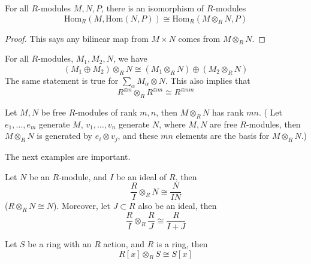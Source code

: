 \documentclass[openany]{book}
\begin{document}
\begin{thm}
    For all $R$-modules $M,N,P$, there is an isomorphism of $R$-modules
    \begin{equation*}
        \text{Hom}_R(M,\text{Hom}(N,P))\cong\text{Hom}_R(M\otimes_RN,P)
    \end{equation*}
\end{thm}
\begin{proof}
    This says any bilinear map from $M\times N$ comes from $M\otimes_RN$.
\end{proof}


\begin{prop}
    For all $R$-modules, $M_1,M_2, N$, we have 
    \begin{equation*}
        (M_1\oplus M_2)\otimes_RN\cong (M_1\otimes_RN)\oplus(M_2\otimes_RN)
    \end{equation*}
    The same statement is true for $\sum_\alpha M_\alpha\otimes N$. This also implies that 
    \begin{equation*}
        R^{\oplus n}\otimes_R R^{\oplus m}\cong R^{\oplus nm}
    \end{equation*}
\end{prop}


\begin{prop}
    Let $M,N$ be free $R$-modules of rank $m,n$, then $M\otimes_R N$ has rank $mn$.
   ( Let $e_1,\dots, e_m$ generate $M$, $v_1,\dots, v_n$ generate $N$, where $M,N$ are free $R$-modules, then $M\otimes_RN$ is generated by $e_i\otimes v_j$, and these $mn$ elements are the basis for $M\otimes_RN$.)
\end{prop}



\begin{warn}
    The next examples are important.
\end{warn}
\begin{prop}
    Let $N$ be an $R$-module, and $I$ be an ideal of $R$, then 
    \begin{equation*}
        \frac{R}{I}\otimes_RN\cong\frac{N}{IN}
    \end{equation*}
    ($R\otimes_RN\cong N$). Moreover, let $J\subset R$ also be an ideal, then 
    \begin{equation*}
        \frac{R}{I}\otimes_R\frac{R}{J}\cong\frac{R}{I+J}
    \end{equation*}
\end{prop}

\begin{prop}
    Let $S$ be a ring with an $R$ action, and $R$ is a ring, then 
    \begin{equation*}
        R[x]\otimes_RS\cong S[x]
    \end{equation*}
\end{prop}
\end{document}
